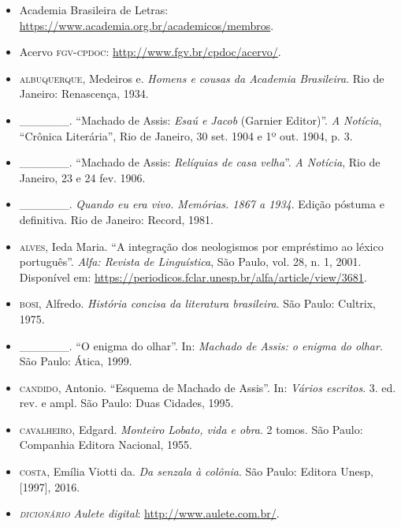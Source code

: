 \begin{itemize}
\item Academia Brasileira de Letras:
\url{https://www.academia.org.br/academicos/membros}.

\item Acervo \textsc{fgv-cpdoc}: \url{http://www.fgv.br/cpdoc/acervo/}.

\item \textsc{albuquerque}, Medeiros e. \emph{Homens e cousas da Academia Brasileira}.
Rio de Janeiro: Renascença, 1934.

\item \_\_\_\_\_\_. ``Machado de Assis: \emph{Esaú e Jacob} (Garnier
Editor)''. \emph{A Notícia}, ``Crônica Literária'', Rio de Janeiro, 30
set. 1904 e 1º out. 1904, p. 3.

\item \_\_\_\_\_\_. ``Machado de Assis: \emph{Relíquias de casa velha}''.
\emph{A Notícia}, Rio de Janeiro, 23 e 24 fev. 1906.

\item \_\_\_\_\_\_. \emph{Quando eu era vivo. Memórias. 1867 a 1934}. Edição
póstuma e definitiva. Rio de Janeiro: Record, 1981.

\item \textsc{alves}, Ieda Maria. ``A integração dos neologismos por empréstimo ao
léxico português''. \emph{Alfa: Revista de Linguística}, São Paulo, vol.
28, n. 1, 2001. Disponível em:
\url{https://periodicos.fclar.unesp.br/alfa/article/view/3681}.

\item \textsc{bosi}, Alfredo. \emph{História concisa da literatura brasileira}. São
Paulo: Cultrix, 1975.

\item \_\_\_\_\_\_. ``O enigma do olhar''. In: \emph{Machado de Assis: o
enigma do olhar}. São Paulo: Ática, 1999.

\item \textsc{candido}, Antonio. ``Esquema de Machado de Assis''. In: \emph{Vários
escritos}. 3. ed. rev. e ampl. São Paulo: Duas Cidades, 1995.

\item \textsc{cavalheiro}, Edgard. \emph{Monteiro Lobato, vida e obra}. 2 tomos. São
Paulo: Companhia Editora Nacional, 1955.

\item \textsc{costa}, Emília Viotti da. \emph{Da senzala à colônia}. São Paulo: Editora
Unesp, {[}1997{]}, 2016.

\item\emph{\textsc{dicionário} Aulete digital}: \url{http://www.aulete.com.br/}.


\end{itemize}
